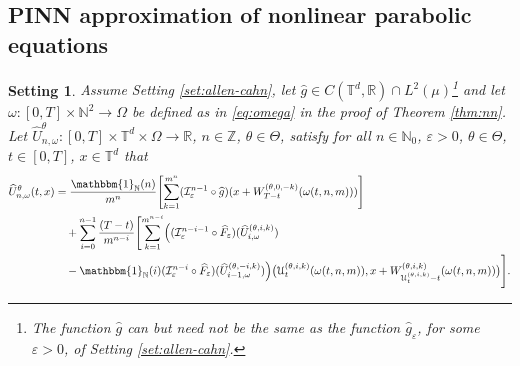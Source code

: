 \documentclass{article}
\numberwithin{equation}{section}
\newcommand{\T}{\mathbb{T}}
\newcommand{\R}{\mathbb{R}}
\newcommand{\N}{\mathbb{N}}
\newcommand{\Z}{\mathbb{Z}}
\newcommand{\cI}{\mathcal{I}}
\renewcommand{\epsilon}{\varepsilon}
\newcommand{\1}{\mathbbm{1}}
\DeclarePairedDelimiter{\br}{[}{]}
\DeclarePairedDelimiter{\pr}{(}{)}
\newcommand{\Fhat}{\widehat{F}}
\newcommand{\Uhat}{\widehat{U}}
\newcommand{\ghat}{\widehat{g}}
\newtheorem{setting}[theorem]{Setting}%
\begin{document}
\subsection{PINN approximation of nonlinear parabolic equations}

\begin{setting}\label{set:pinn}
Assume Setting \ref{set:allen-cahn}, let $\ghat \in C(\T^d,\R)\cap L^2(\mu)$\footnote{The function $\ghat$ can but need not be the same as the function $\ghat_\epsilon$, for some $\epsilon>0$, of Setting \ref{set:allen-cahn}. } and let $\omega:[0,T]\times\N^2\to\Omega$ be defined as in \eqref{eq:omega} in the proof of Theorem \ref{thm:nn}. Let $\Uhat_{n,\omega}^\theta \colon [0,T] \times \T^d\times \Omega\to \R$, 
$n\in\Z$, 
$\theta\in\Theta$, satisfy for all 
$n\in\N_0$, 
$\epsilon>0$,
$\theta\in\Theta$, $t\in[0,T]$, $x\in\T^d$ that
\begin{equation}\label{eq:nn-pido}
\begin{split}
\Uhat_{n,\omega}^\theta(t,x) 
& = \frac{\1_\N(n)}{m^n} \br[\Bigg]{ \sum_{k=1}^{m^n} (\cI_\epsilon^{n-1}\circ\ghat)\pr[\bigl]{x + W_{T-t}^{(\theta,0,-k)}(\omega(t,n,m))} } \\
& \quad + \sum_{i=0}^{n-1} \frac{(T-t)}{m^{n-i}}\br[\Bigg]{ \sum_{k=1}^{m^{n-i}} \pr[\Big]{ (\cI_\epsilon^{n-i-1}\circ\Fhat_\epsilon)(\Uhat_{i,\omega}^{(\theta,i,k)}) \\
&\quad - \1_\N(i) (\cI_\epsilon^{n-i}\circ\Fhat_\epsilon)( \Uhat_{i-1,\omega}^{(\theta,-i,k)}) } \pr[\big]{ \EuScript{U}_t^{(\theta,i,k)}(\omega(t,n,m)), x + W_{\EuScript{U}_t^{(\theta,i,k)}-t}^{(\theta,i,k)} (\omega(t,n,m))} }.
\end{split}
\end{equation}
\end{setting}
\end{document}
